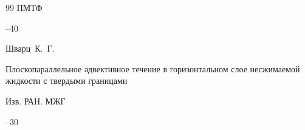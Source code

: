 \begin{thebibliography}{99}
\jour ПМТФ




--40




























\by  Шварц~К.~Г.

\paper Плоскопараллельное адвективное течение в горизонтальном слое несжимаемой жидкости с твердыми границами

\jour Изв. РАН. МЖГ



--30



\end{thebibliography}
